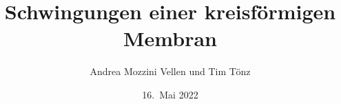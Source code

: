 %
%
%


\beamertemplatenavigationsymbolsempty
\title[Kreis]{Schwingungen einer kreisförmigen Membran}
\author[A.~M.~V.~und~T.~T.]{Andrea Mozzini Vellen und Tim Tönz}
\date[]{16.~Mai 2022}

